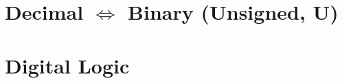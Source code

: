 \documentclass[8pt,a4paper,landscape]{extarticle}
\begin{document}
\pagestyle{empty}
\setlength{\abovedisplayskip}{1pt}
\setlength{\belowdisplayskip}{1pt}
\setlength{\abovedisplayshortskip}{0pt}
\setlength{\belowdisplayshortskip}{0pt}

\begin{multicols*}{3}
\section*{Decimal $\iff$ Binary (Unsigned, U)}

\pagebreak
\section*{Digital Logic}
\end{multicols*}
\end{document}
